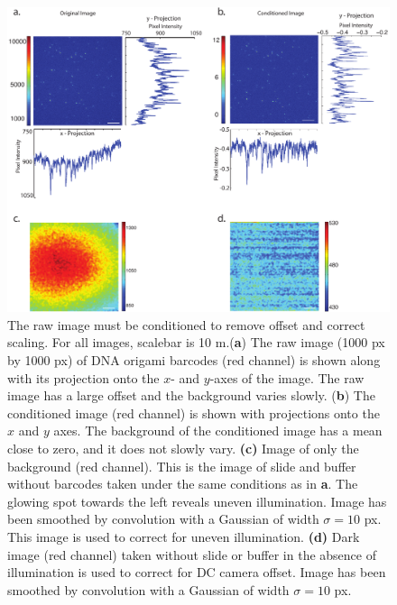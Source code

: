 \begin{figure}[htbp]
\begin{center}
	\includegraphics[width=\textwidth]{figures/theoryConditionedImage}
	\caption{The raw image must be conditioned to remove offset and correct scaling. For all images, scalebar is 10 \textmu m.(\textbf{a}) The raw image (1000 px by 1000 px) of DNA origami barcodes (red channel) is shown along with  its projection onto the $x$- and $y$-axes of the image. The raw image has a large offset and the background varies slowly. (\textbf{b}) The conditioned image (red channel) is shown with projections onto the $x$ and $y$ axes. The background of the conditioned image has a mean close to zero, and it does not slowly vary. \textbf{(c)} Image of only the background (red channel). This is the image of slide and buffer without barcodes taken under the same conditions as in \textbf{a}. The glowing spot towards the left reveals uneven illumination. Image has been smoothed by convolution with a Gaussian of width $\sigma=10$ px. This image is used to correct for uneven illumination.   \textbf{(d)} Dark image (red channel) taken without slide or buffer in the absence of illumination is used to correct for DC camera offset. Image has been smoothed by convolution with a Gaussian of width $\sigma=10$ px. \label{fig:conditionedImage}}
\end{center}	
\end{figure}





